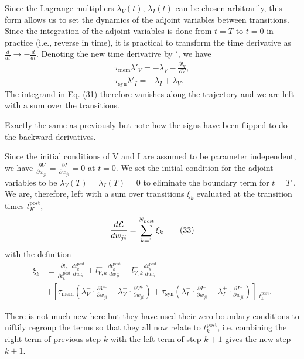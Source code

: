 \documentclass[a4paper]{article}
\newcommand{\blue}[1]{{\color{blue}#1}}
\begin{document}
\blue{
  Since the Lagrange multipliers $\lambda_V(t)$, $\lambda_I(t)$ can be
  chosen arbitrarily, this form allows us to set the dynamics of 
the adjoint variables between transitions. Since the integration of the adjoint variables is done from $t = T$ to
$t = 0$ in practice (i.e., reverse in time), it is practical to
transform the time derivative as $\frac{d}{dt} \rightarrow
-\frac{d}{dt}$. Denoting the new time derivative by $'$, we have
\begin{align}
  \tau_{\text{mem}} \lambda'_V = -\lambda_V - \frac{\partial
    l_V}{\partial V}, \tag{32a} \\
  \tau_{\text{syn}} \lambda'_I = -\lambda_I + \lambda_V. \tag{32b}
\end{align}
The integrand in Eq. (31) therefore vanishes along the trajectory and
we are left with a sum over the transitions.
}

Exactly the same as previously but note how the signs have been
flipped to do the backward derivatives.

\blue{
  Since the initial conditions of V and I are assumed to be parameter
  independent, we have $\frac{\partial V}{\partial w_{ji}} =
  \frac{\partial I}{\partial w_{ji}} = 0$ at $t= 0$. We set the
  initial condition for the adjoint variables to be $\lambda_V(T) =
  \lambda_I(T) = 0$ to eliminate the boundary term for $t = T$ . We
  are, therefore, left with a sum over transitions $\xi_k$ evaluated
  at the transition times $t_K^{\text{post}}$,
  \begin{align}
    \frac{d \cal L}{d w_{ji}} = \sum_{k=1}^{N_{\text{post}}} \xi_k \tag{33}
  \end{align}
  with the definition
  \begin{align}
    \xi_k &\equiv \frac{\partial l_p}{\partial t_k^{\text{post}}} \frac{d
      t_k^{\text{post}}}{d w_{ji}}
    + l^-_{V,k}
      \frac{dt_{k}^{\text{post}}}{d w_{ji}} - l^+_{V,k} \frac{d
        t_k^{\text{post}}}{d w_{ji}} \nonumber \\
      &+ \left[\tau_{\text{mem}} \left( \lambda^-_V \cdot
        \frac{\partial V^-}{\partial w_{ji}} - \lambda_V^+ \cdot
        \frac{\partial V^+}{\partial w_{ji}} \right)
      + \tau_{\text{syn}} \left(\lambda^-_I \cdot \frac{\partial
        I^-}{\partial w_{ji}} - \lambda_I^+ \cdot \frac{\partial
        I^+}{\partial w_{ji}} \right)
      \right]\bigg|_{t_k^{\text{post}}} . \tag{34}
  \end{align}
}

  There is not much new here but they have used their zero boundary
  conditions to niftily regroup the terms so that they all now relate
  to $t_k^{\text{post}}$, i.e. combining the right term of previous
  step $k$ with the left term of step $k+1$ gives the new step $k+1$.
\end{document}
